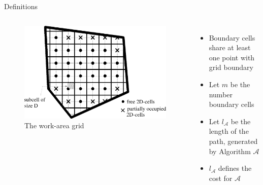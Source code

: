 \documentclass{beamer}
\begin{document}
\begin{frame}{Definitions}
    \begin{columns}
        \begin{figure}
            \includegraphics[width=0.8\linewidth]{Images/inv_fig1.png}
            \caption{The work-area grid}
        \end{figure}
        \begin{itemize}
            \item Boundary cells share at least one point with grid boundary
            \item Let $m$ be the number boundary cells
            \item Let $l_\mathcal{A}$ be the length of the path, generated by Algorithm $\mathcal{A}$
            \item $l_\mathcal{A}$ defines the cost for $\mathcal{A}$
        \end{itemize}
    \end{columns}
\end{frame}
\end{document}
